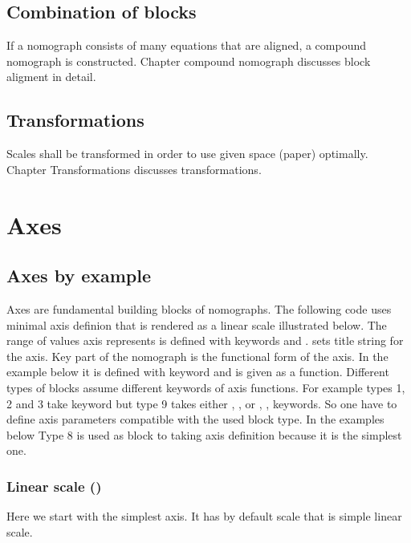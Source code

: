 \documentclass[a4paper,11pt,english]{sphinxmanual}
\begin{document}
\section{Combination of blocks}
\label{\detokenize{main_page:combination-of-blocks}}
If a nomograph consists of many equations that are aligned, a compound nomograph is constructed. Chapter compound nomograph
discusses block aligment in detail.


\section{Transformations}
\label{\detokenize{main_page:transformations}}
Scales shall be transformed in order to use given space (paper) optimally. Chapter Transformations discusses transformations.


\chapter{Axes}
\label{\detokenize{axes/axes:axes}}\label{\detokenize{axes/axes::doc}}

\section{Axes by example}
\label{\detokenize{axes/axes:axes-by-example}}
Axes are fundamental building blocks of nomographs. The following code uses minimal axis definion  that is
rendered as a linear scale illustrated below. The range of values axis represents is defined with keywords 
and .  sets title string for the axis. Key part of the nomograph is the functional form of the axis.
In the example below it is defined with keyword  and is given as a function. Different types of blocks assume different keywords
of axis functions. For example types 1, 2 and 3 take keyword  but type 9 takes either , ,  or
, ,  keywords. So one have to define axis parameters compatible with the used block type.
In the examples below Type 8 is used as block to taking axis definition because it is the simplest one.


\subsection{Linear scale ()}
\label{\detokenize{axes/axes:linear-scale-scale-type-linear}}\label{\detokenize{axes/axes:axes-ex-code-ref}}
Here we start with the simplest axis. It has by default scale  that is simple linear scale.
\end{document}

